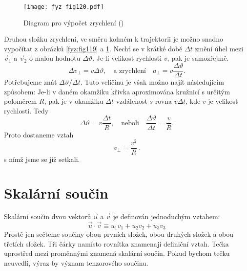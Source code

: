     \begin{figure}[ht!]  %
      \centering
      \texttt{[image: fyz\_fig120.pdf]}
      \caption{Diagram pro výpočet zrychlení
              (\cite[s.~163]{Feynman01})}
      \label{fyz:fig120}
    \end{figure}
    Druhou složku zrychlení, ve směru kolmém k trajektorii je možno snadno vypočítat z obrázků
    \ref{fyz:fig119} a \ref{fyz:fig120}. Nechť se v krátké době \(\Delta t\) změní úhel mezi 
    \(\vec{v}_1\) a \(\vec{v}_2\) o malou hodnotu \(\Delta\vartheta\). Je-li velikost rychlosti 
    \(v\), pak je samozřejmě.    
    \begin{equation*}
      \Delta v_\perp = v\Delta\vartheta, \quad\text{a zrychlení}\quad
      a_\perp = v\frac{\Delta\vartheta}{\Delta t}.
    \end{equation*}
    Potřebujeme znát \(\Delta\vartheta/\Delta t\). Tuto veličinu je však možno najít následujícím 
    způsobem: Je-li v daném okamžiku křivka aproximována kružnicí s určitým poloměrem \(R\), pak je 
    v okamžiku \(\Delta t\) vzdálenost \(s\) rovna \(v\Delta t\), kde \(v\) je velikost rychlosti. 
    Tedy
    \begin{equation*}
      \Delta\vartheta = v\frac{\Delta t}{R}, \quad\text{neboli}\quad
      \frac{\Delta\vartheta}{\Delta t} = \frac{v}{R}.
    \end{equation*}
    Proto dostaneme vztah
    \begin{equation}\label{fyz:eq159}
      \boxed{a_\perp = \frac{v^2}{R}}\,.
    \end{equation}
    s nímž jsme se již setkali.
    
  \section{Skalární součin}\label{fyz:IchapXIsecVI}
    Skalární součin dvou vektorů \(\vec{u}\) a \(\vec{v}\) je definován jednoduchým vztahem: 
    \begin{equation*}
      \vec{u}\cdot\vec{v} \equiv u_1v_1 + u_2v_2 + u_3v_3
    \end{equation*}
    Prostě jen sečteme součiny obou prvních složek, obou druhých složek a obou třetích složek. Tři
    čárky namísto rovnítka znamenají definiční vztah. Tečka uprostřed mezi proměnnými znamená
    skalární součin. Pokud bychom tečku neuvedli, výraz by význam tenzorového součinu.

